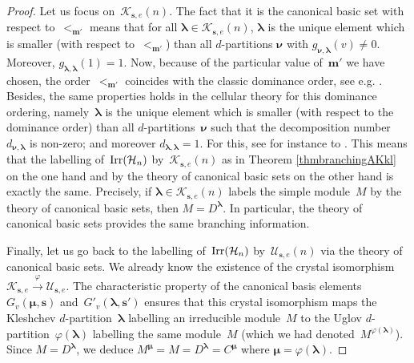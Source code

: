 \documentclass[twoside,12pt]{amsart}
\theoremstyle{plain}
\begin{document}
\begin{proof}
Let us focus on~${\mathcal{K}}_{{\mathbf{s}},e}(n)$. The fact that it is the canonical basic set 
with respect to~$<_{{\mathbf{m}}'}$ means that for all ${\boldsymbol{\lambda}}\in{\mathcal{K}}_{{\mathbf{s}},e}(n)$, ${\boldsymbol{\lambda}}$ 
is the unique element which is smaller (with respect to~$<_{{\mathbf{m}}'}$) than all 
$d$-partitions ${\boldsymbol{\nu}}$ with $g_{{\boldsymbol{\nu}},{\boldsymbol{\lambda}}}(v)\neq0$. Moreover, 
$g_{{\boldsymbol{\lambda}},{\boldsymbol{\lambda}}}(1)=1$. Now, because of the particular value of~${\mathbf{m}}'$ we have 
chosen, the order~$<_{{\mathbf{m}}'}$ coincides with the classic dominance order, see e.g.
\cite[Proof of Proposition 1.2.11]{Gerber2014b}.
Besides, the same properties holds in the cellular theory for this dominance 
ordering, namely~${\boldsymbol{\lambda}}$ is the unique element which is smaller (with respect 
to the dominance order) than all $d$-partitions~${\boldsymbol{\nu}}$ such that the 
decomposition number $d_{{\boldsymbol{\nu}},{\boldsymbol{\lambda}}}$ is non-zero; and moreover 
$d_{{\boldsymbol{\lambda}},{\boldsymbol{\lambda}}}=1$. For this, see for instance to \cite[Theorem 2.2]{Ariki2001}.
This means that the labelling of~${\text{\rm Irr}}({\mathcal{H}}_n)$ by~${\mathcal{K}}_{{\mathbf{s}},e}(n)$ as in
Theorem \ref{thmbranchingAKkl} on the one hand and by the theory of canonical 
basic sets on the other hand is exactly the same. Precisely, if 
${\boldsymbol{\lambda}}\in{\mathcal{K}}_{{\mathbf{s}},e}(n)$ labels the simple module~$M$ by the theory of canonical 
basic sets, then $M=D^{\boldsymbol{\lambda}}$. In particular, the theory of canonical basic sets 
provides the same branching information.

Finally, let us go back to the labelling of~${\text{\rm Irr}}({\mathcal{H}}_n)$ by~${\mathcal{U}}_{{\mathbf{s}},e}(n)$ 
via the theory of canonical basic sets. We already know the existence of the 
crystal isomorphism ${\mathcal{K}}_{{\mathbf{s}},e} \overset{\varphi}{\longrightarrow} {\mathcal{U}}_{{\mathbf{s}},e}$. The 
characteristic property of the canonical basis elements~$G_v({\boldsymbol{\mu}},{\mathbf{s}})$ 
and~$G'_v({\boldsymbol{\lambda}},{\mathbf{s}}')$ \cite[Section 4]{Uglov1999} ensures that this crystal 
isomorphism maps the Kleshchev $d$-partition~${\boldsymbol{\lambda}}$ labelling an irreducible 
module~$M$ to the Uglov $d$-partition~$\varphi({\boldsymbol{\lambda}})$ labelling the same 
module~$M$ (which we had denoted~$M^{\varphi({\boldsymbol{\lambda}})}$). Since $M=D^{\boldsymbol{\lambda}}$, we 
deduce $M^{\boldsymbol{\mu}} = M =  D^{\boldsymbol{\lambda}} = C^{\boldsymbol{\mu}}$ where ${\boldsymbol{\mu}} = \varphi({\boldsymbol{\lambda}})$.
\end{proof}
\end{document}
